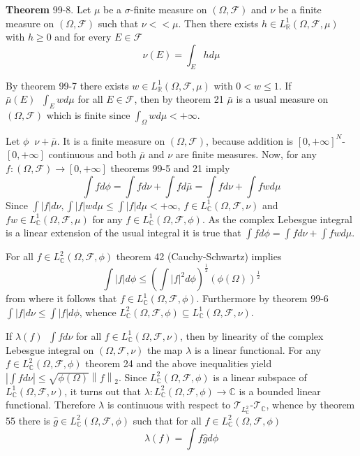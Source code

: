 \documentclass[a4paper]{article}
\newcommand{\clo}[1]{\left [ #1 \right ]}
\newcommand{\brac}[1]{\left ( #1 \right )}
\newcommand{\abs}[1]{\left | #1 \right |}
\newcommand{\nrm}[1]{\left\| #1 \right \|}
\newcommand{\Real}{\mathbb{R}}
\newcommand{\Zinf}{\clo{ 0, +\infty }}
\newcommand{\Cplx}{\mathbb{C}}
\newcommand{\Tcal}{\mathcal{T}}
\newcommand{\Fcal}{\mathcal{F}}
\newcommand{\defn}{\mathop{\overset{\Delta}{=}}\nolimits}
\begin{document}
\label{thm:radon_nikodym_finite_meas} \noindent \textbf{Theorem} 99-8.
Let $\mu$ be a $\sigma$-finite measure on $\brac{\Omega, \Fcal}$ and $\nu$ be a finite measure on $\brac{\Omega, \Fcal}$ such that $\nu<<\mu$. Then there exists $h\in L^1_\Real\brac{\Omega, \Fcal, \mu}$ with $h\geq 0$ and for every $E\in \Fcal$ \[\nu\brac{E} = \int_E h d\mu\]

By theorem 99-7 there exists $w\in L^1_\Real\brac{\Omega, \Fcal, \mu}$ with $0<w\leq 1$. If $\bar{\mu}\brac{E} \defn \int_E w d\mu$ for all $E\in \Fcal$, then by theorem 21 $\bar{\mu}$ is a usual measure on $\brac{\Omega, \Fcal}$ which is finite since $\int_\Omega w d\mu<+\infty$.

Let $\phi\defn \nu + \bar{\mu}$. It is a finite measure on $\brac{\Omega, \Fcal}$, because addition is $\Zinf^N$-$\Zinf$ continuous and both $\bar{\mu}$ and $\nu$ are finite measures. Now, for any $f:\brac{\Omega, \Fcal}\to \Zinf$ theorems 99-5 and 21 imply \[\int f d\phi = \int f d\nu + \int f d\bar{\mu} = \int f d\nu + \int f w d\mu\] Since $\int \abs{f} d\nu, \int \abs{f} w d\mu \leq \int \abs{f} d\mu<+\infty$, $f\in L^1_\Cplx\brac{\Omega, \Fcal,\nu}$ and $f w\in L^1_\Cplx\brac{\Omega, \Fcal,\mu}$ for any $f\in L^1_\Cplx\brac{\Omega, \Fcal, \phi}$. As the complex Lebesgue integral is a linear extension of the usual integral it is true that $\int f d\phi = \int f d\nu + \int f w d\mu$.

For all $f \in L^2_\Cplx\brac{\Omega, \Fcal, \phi}$ theorem 42 (Cauchy-Schwartz) implies \[\int \abs{f}d\phi\leq \brac{\int\abs{f}^2 d\phi}^\frac{1}{2} \brac{\phi\brac{\Omega}}^\frac{1}{2}\] from where it follows that $f\in L^1_\Cplx\brac{\Omega, \Fcal ,\phi}$. Furthermore by theorem 99-6 $\int \abs{f} d\nu \leq \int \abs{f} d\phi$, whence $L^2_\Cplx\brac{\Omega, \Fcal, \phi}\subseteq L^1_\Cplx\brac{\Omega, \Fcal, \nu}$.

If $\lambda\brac{f}\defn \int f d\nu$ for all $f \in L^1_\Cplx\brac{\Omega, \Fcal, \nu}$, then by linearity of the complex Lebesgue integral on $\brac{\Omega, \Fcal, \nu}$ the map $\lambda$ is a linear functional. For any $f \in L^2_\Cplx\brac{\Omega, \Fcal, \phi}$ theorem 24 and the above inequalities yield $\abs{\int f d\nu} \leq \sqrt{\phi\brac{\Omega}} \nrm{f}_2$. Since $L^2_\Cplx\brac{\Omega, \Fcal, \phi}$ is a linear subspace of $L^1_\Cplx\brac{\Omega, \Fcal, \nu}$, it turns out that $\lambda:L^2_\Cplx\brac{\Omega, \Fcal, \phi}\to \Cplx$ is a bounded linear functional. Therefore $\lambda$ is continuous with respect to $\Tcal_{L^2_\Cplx}$-$\Tcal_\Cplx$, whence by theorem 55 there is $\hat{g}\in L^2_\Cplx\brac{\Omega, \Fcal, \phi}$ such that for all $f\in L^2_\Cplx\brac{\Omega, \Fcal, \phi}$ \[\lambda\brac{f}=\int f \hat{g} d\phi\]
\end{document}
